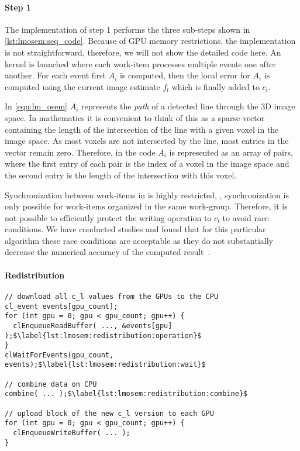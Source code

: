 \paragraph{Step 1}
The implementation of step 1 performs the three sub-steps shown in \autoref{lst:lmosem:seq_code}.
Because of GPU memory restrictions, the \OpenCL implementation is not straightforward, therefore, we will not show the detailed code here.
An \OpenCL kernel is launched where each work-item processes multiple events one after another.
For each event first $A_i$ is computed, then the local error for $A_i$ is computed using the current image estimate $f_l$ which is finally added to $c_l$.

In \autoref{equ:lm_osem} $A_i$ represents the \emph{path} of a detected line through the 3D image space.
In mathematics it is convenient to think of this as a sparse vector containing the length of the intersection of the line with a given voxel in the image space.
As most voxels are not intersected by the line, most entries in the vector remain zero.
Therefore, in the \OpenCL code $A_i$ is represented as an array of pairs, where the first entry of each pair is the index of a voxel in the image space and the second entry is the length of the intersection with this voxel.

Synchronization between work-items in \OpenCL is highly restricted, \ie, synchronization is only possible for work-items organized in the same work-group.
Therefore, it is not possible to efficiently protect the writing operation to $c_l$ to avoid race conditions.
We have conducted studies and found that for this particular algorithm these race conditions are acceptable as they do not substantially decrease the numerical accuracy of the computed result~\cite{SchellmannGoMeKoScWuBu2009}.


\paragraph{Redistribution}

\begin{lstlisting}[float,
  caption={OpenCL pseudocode for the redistribution phase},
  label={lst:lmosem:redistribution}]
// download all c_l values from the GPUs to the CPU
cl_event events[gpu_count];
for (int gpu = 0; gpu < gpu_count; gpu++) {
  clEnqueueReadBuffer( ..., &events[gpu] );$\label{lst:lmosem:redistribution:operation}$
}
clWaitForEvents(gpu_count, events);$\label{lst:lmosem:redistribution:wait}$

// combine data on CPU
combine( ... );$\label{lst:lmosem:redistribution:combine}$

// upload block of the new c_l version to each GPU
for (int gpu = 0; gpu < gpu_count; gpu++) {
  clEnqueueWriteBuffer( ... );
}
\end{lstlisting}

